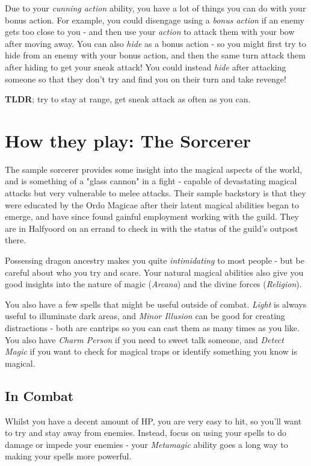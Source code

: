 \documentclass[10pt,a4paper]{article}
\begin{document}
Due to your \emph{cunning action} ability, you have a lot of things you can do with your bonus action.
For example, you could disengage using a \emph{bonus action} if an enemy gets too close to you - and then use your \emph{action} to attack them with your bow after moving away.
You can also \emph{hide} as a bonus action - so you might first try to hide from an enemy with your bonus action, and then the same turn attack them after hiding to get your sneak attack!
You could instead \emph{hide} after attacking someone so that they don't try and find you on their turn and take revenge!

\textbf{TLDR}; try to stay at range, get sneak attack as often as you can.

\newpage

\section{How they play: The Sorcerer}

The sample sorcerer provides some insight into the magical aspects of the world, and is something of a "glass cannon" in a fight - capable of devastating magical attacks but very vulnerable to melee attacks.
Their sample backstory is that they were educated by the Ordo Magicae after their latent magical abilities began to emerge, and have since found gainful employment working with the guild.
They are in Halfyoord on an errand to check in with the status of the guild's outpost there.

Possessing dragon ancestry makes you quite \emph{intimidating} to most people - but be careful about who you try and scare.
Your natural magical abilities also give you good insights into the nature of magic (\emph{Arcana}) and the divine forces (\emph{Religion}).

You also have a few spells that might be useful outside of combat.
\emph{Light} is always useful to illuminate dark areas, and \emph{Minor Illusion} can be good for creating distractions - both are cantrips so you can cast them as many times as you like.
You also have \emph{Charm Person} if you need to sweet talk someone, and \emph{Detect Magic} if you want to check for magical traps or identify something you know is magical.

\subsection{In Combat}

Whilst you have a decent amount of HP, you are very easy to hit, so you'll want to try and stay away from enemies.
Instead, focus on using your spells to do damage or impede your enemies - your \emph{Metamagic} ability goes a long way to making your spells more powerful.
\end{document}
